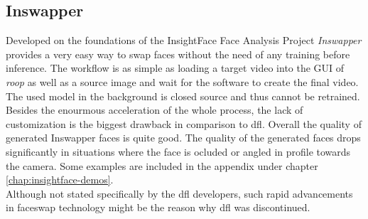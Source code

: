 \documentclass[
  a4paper,  %
  twoside,  %
  bibliography=totoc,
  headsepline,
  cleardoublepage=empty,
  parskip=half,
  draft=false
]{scrbook}
\begin{document}
\subsection{Inswapper}
\label{sec:roop}
Developed on the foundations of the InsightFace Face Analysis Project \cite{insightfaceInsightFaceWebsite} \textit{Inswapper} provides a very easy way to swap faces without the need of any training before inference. The workflow is as simple as loading a target video into the GUI of \textit{roop} \cite{sangwanRoop2023} as well as a source image and wait for the software to create the final video. The used model in the background is closed source and thus cannot be retrained. Besides the enourmous acceleration of the whole process, the lack of customization is the biggest drawback in comparison to \gls{dfl}. Overall the quality of generated Inswapper faces is quite good. The quality of the generated faces drops significantly in situations where the face is ocluded or angled in profile towards the camera. Some examples are included in the appendix under chapter \ref{chap:insightface-demos}. \\
Although not stated specifically by the \gls{dfl} developers, such rapid advancements in faceswap technology might be the reason why \gls{dfl} was discontinued. 
\end{document}
